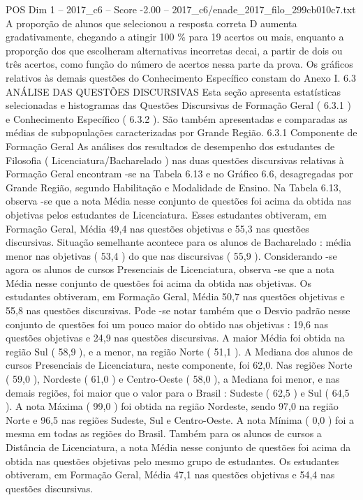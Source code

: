 \begin{textsample}{POS Dim 1 – 2017\_c6 – Score -2.00 – 2017\_c6/enade\_2017\_filo\_299cb010c7.txt}
A proporção de alunos que selecionou a resposta correta D aumenta gradativamente, chegando a atingir 100 \% para 19 acertos ou mais, enquanto a proporção dos que escolheram alternativas incorretas decai, a partir de dois ou três acertos, como função do número de acertos nessa parte da prova.
Os gráficos relativos às demais questões do Conhecimento Específico constam do Anexo I. 6.3 ANÁLISE DAS QUESTÕES DISCURSIVAS Esta seção apresenta estatísticas selecionadas e histogramas das Questões Discursivas de Formação Geral ( 6.3.1 ) e Conhecimento Específico ( 6.3.2 ).
São também apresentadas e comparadas as médias de subpopulações caracterizadas por Grande Região. 6.3.1 Componente de Formação Geral As análises dos resultados de desempenho dos estudantes de Filosofia ( Licenciatura/Bacharelado ) nas duas questões discursivas relativas à Formação Geral encontram -se na Tabela 6.13 e no Gráfico 6.6, desagregadas por Grande Região, segundo Habilitação e Modalidade de Ensino.
Na Tabela 6.13, observa -se que a nota Média nesse conjunto de questões foi acima da obtida nas objetivas pelos estudantes de Licenciatura.
Esses estudantes obtiveram, em Formação Geral, Média 49,4 nas questões objetivas e 55,3 nas questões discursivas.
Situação semelhante acontece para os alunos de Bacharelado : média menor nas objetivas ( 53,4 ) do que nas discursivas ( 55,9 ).
Considerando -se agora os alunos de cursos Presenciais de Licenciatura, observa -se que a nota Média nesse conjunto de questões foi acima da obtida nas objetivas.
Os estudantes obtiveram, em Formação Geral, Média 50,7 nas questões objetivas e 55,8 nas questões discursivas.
Pode -se notar também que o Desvio padrão nesse conjunto de questões foi um pouco maior do obtido nas objetivas : 19,6 nas questões objetivas e 24,9 nas questões discursivas.
A maior Média foi obtida na região Sul ( 58,9 ), e a menor, na região Norte ( 51,1 ).
A Mediana dos alunos de cursos Presenciais de Licenciatura, neste componente, foi 62,0.
Nas regiões Norte ( 59,0 ), Nordeste ( 61,0 ) e Centro-Oeste ( 58,0 ), a Mediana foi menor, e nas demais regiões, foi maior que o valor para o Brasil : Sudeste ( 62,5 ) e Sul ( 64,5 ).
A nota Máxima ( 99,0 ) foi obtida na região Nordeste, sendo 97,0 na região Norte e 96,5 nas regiões Sudeste, Sul e Centro-Oeste.
A nota Mínima ( 0,0 ) foi a mesma em todas as regiões do Brasil.
Também para os alunos de cursos a Distância de Licenciatura, a nota Média nesse conjunto de questões foi acima da obtida nas questões objetivas pelo mesmo grupo de estudantes.
Os estudantes obtiveram, em Formação Geral, Média 47,1 nas questões objetivas e 54,4 nas questões discursivas.

\end{textsample}
